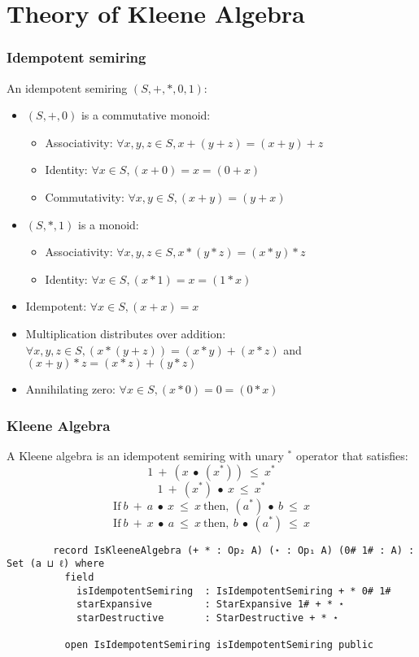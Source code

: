 \documentclass[xcolor={dvipsnames}]{beamer}
\begin{document}
\section{Theory of Kleene Algebra}

\begin{frame}
  \frametitle{Idempotent semiring}
  An idempotent semiring $(S,+,*,0,1)$:
  \begin{itemize}
    \item $(S,+,0)$ is a commutative monoid:
    \begin{itemize}
      \item Associativity: $\forall x,y,z \in S, x + (y + z) = (x + y) + z$
      \item Identity: $\forall x \in S, (x + 0) = x = (0 + x)$
      \item Commutativity: $\forall x,y \in S, (x + y) = (y + x)$
    \end{itemize}
    \item $(S,*,1)$ is a monoid:
    \begin{itemize}
      \item Associativity: $ \forall x,y,z \in S, x * (y*z)  = (x*y)*z$
      \item Identity: $\forall x \in S, (x * 1) = x = (1 * x)$
    \end{itemize}
    \item Idempotent: $\forall x \in S, (x + x) = x$
    \item Multiplication distributes over addition: \(\forall x , y , z \in S, (x * (y + z)) = (x * y) + (x
    * z)\) and \( (x + y) * z = (x * z) + (y * z) \)
    \item Annihilating zero: \(\forall x \in S, (x * 0) = 0 = (0 * x)\)
    \end{itemize}

\end{frame}

\begin{frame}[fragile]
  \frametitle{Kleene Algebra}

    A Kleene algebra is an idempotent semiring with unary $^{*}$ operator that satisfies:
        \[ 1\ +\ (x\ ∙\ (x^{*}))\ \leq\ x^{*}\]
        \[ 1\ +\ (x^{*})\ ∙\ x\ \leq\ x^{*}\]
        \[\text{If} \ b\ +\ a\  ∙\ x\ \leq\ x\ \text{then},\ (a^{*})\ ∙\ b\ \leq\ x\]
        \[\text{If} \ b\ +\ x\ ∙\ a\ \leq\ x \  \text{then},\ b\ ∙\ (a^{*})\ \leq\ x\]

    \begin{verbatim}
        record IsKleeneAlgebra (+ * : Op₂ A) (⋆ : Op₁ A) (0# 1# : A) : Set (a ⊔ ℓ) where
          field
            isIdempotentSemiring  : IsIdempotentSemiring + * 0# 1#
            starExpansive         : StarExpansive 1# + * ⋆
            starDestructive       : StarDestructive + * ⋆
    
          open IsIdempotentSemiring isIdempotentSemiring public
    \end{verbatim}
\end{frame}
\end{document}
